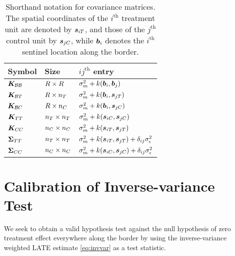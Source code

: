 \begin{table}[bp]
    \centering
    \bgroup
    \def\arraystretch{1.2}%
    \begin{tabular}{lll}
        \hline
        Symbol & Size                       & \(ij^{\mathrm{th}}\) entry                                                      \\ \hline
        \(\bm{K}_{\mathcal{B} \mathcal{B}}\) & \(R \times R\) & \(\sigmamu^2 + k\del{\sentinel_i,\sentinel_j}\)                                 \\ 
        \(\bm{K}_{\mathcal{B} T}\) & \(R \times n_T\) & \(\sigmamu^2 + k\del{\sentinel_i,\svec_{j\treat}}\)                             \\ 
        \(\bm{K}_{\mathcal{B} C}\) & \(R \times n_C\) & \(\sigmamu^2 + k\del{\sentinel_i,\svec_{j\ctrol}}\)                             \\
        \(\bm{K}_{T T}\) & \(n_T \times n_T\) & \(\sigmamu^2 + k\del{\svec_{i\ctrol},\svec_{j\ctrol}}\)                         \\
        \(\bm{K}_{C C}\) & \(n_C \times n_C\) & \(\sigmamu^2 + k\del{\svec_{i\treat},\svec_{j\treat}}\)                         \\ 
        \(\bm{\Sigma}_{T T}\) & \(n_T \times n_T\) & \(\sigmamu^2 + k\del{\svec_{i\treat},\svec_{j\treat}} + \delta_{ij} \sigman^2\) \\ 
        \(\bm{\Sigma}_{C C}\) & \(n_C \times n_C\) & \(\sigmamu^2 + k\del{\svec_{i\ctrol},\svec_{j\ctrol}} + \delta_{ij} \sigman^2\) \\
        \hline
    \end{tabular}
    \egroup
    \caption{
        Shorthand notation for covariance matrices. The spatial coordinates of the \(i^\mathrm{th}\) treatment unit are denoted by \(\bm{s}_{iT}\),
and those of the \(j^\mathrm{th}\) control unit by \(\bm{s}_{jC}\), while \(\bm{b}_i\) denotes the \(i^\mathrm{th}\) sentinel location along the border.
        \label{table:notation}
    }
\end{table}


\section{Calibration of Inverse-variance Test}
\label{sec:calibration}

We seek to obtain a valid hypothesis test against the null hypothesis of zero treatment effect everywhere along the border by using the inverse-variance weighted LATE estimate \autoref{eq:invvar} as a test statistic.

